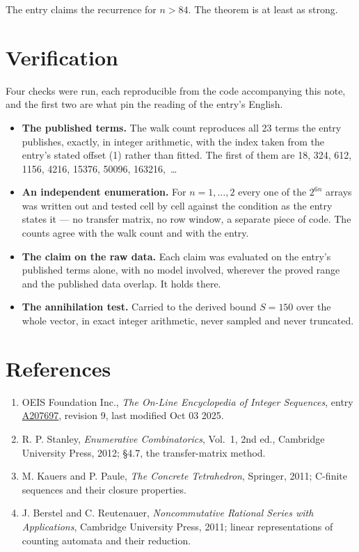 \documentclass[11pt]{article}
\theoremstyle{definition}
\begin{document}
The entry claims the recurrence for $n > 84$. The theorem is at least as strong.

\section{Verification}

Four checks were run, each reproducible from the code accompanying this note, and the first two are what pin the reading of the entry's English.

\begin{itemize}

\item {\bfseries The published terms.} The walk count reproduces all 23 terms the entry publishes, exactly, in integer arithmetic, with the index taken from the entry's stated offset (1) rather than fitted. The first of them are 18, 324, 612, 1156, 4216, 15376, 50096, 163216,~\dots

\item {\bfseries An independent enumeration.} For $n = 1,\dots,2$ every one of the $2^{6n}$ arrays was written out and tested cell by cell against the condition as the entry states it --- no transfer matrix, no row window, a separate piece of code. The counts agree with the walk count and with the entry.

\item {\bfseries The claim on the raw data.} Each claim was evaluated on the entry's published terms alone, with no model involved, wherever the proved range and the published data overlap. It holds there.

\item {\bfseries The annihilation test.} Carried to the derived bound $S = 150$ over the whole vector, in exact integer arithmetic, never sampled and never truncated.

\end{itemize}

\section{References}

\begin{enumerate}

\item OEIS Foundation Inc., \emph{The On-Line Encyclopedia of Integer Sequences}, entry \href{https://oeis.org/A207697}{A207697}, revision 9, last modified Oct 03 2025.

\item R. P. Stanley, \emph{Enumerative Combinatorics}, Vol.~1, 2nd ed., Cambridge University Press, 2012; \S4.7, the transfer-matrix method.

\item M. Kauers and P. Paule, \emph{The Concrete Tetrahedron}, Springer, 2011; C-finite sequences and their closure properties.

\item J. Berstel and C. Reutenauer, \emph{Noncommutative Rational Series with Applications}, Cambridge University Press, 2011; linear representations of counting automata and their reduction.

\end{enumerate}
\end{document}
